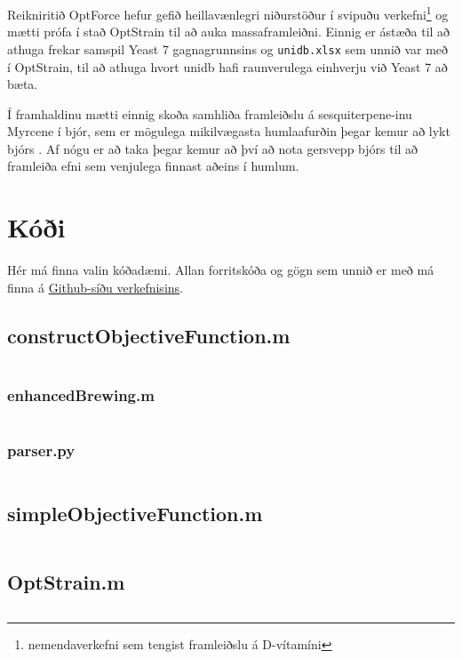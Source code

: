 \documentclass[11pt]{article}
\newcommand{\matlab}[1]{\inputminted[linenos, frame=lines, label=#1, fontsize=\small]{matlab}{#1}}
\begin{document}
\begin{multicols}{2}
Reikniritið OptForce \cite{ranganathan2010optforce} hefur gefið heillavænlegri niðurstöður í svipuðu verkefni\footnote{nemendaverkefni sem tengist framleiðslu á D-vítamíni} og mætti prófa í stað OptStrain til að auka massaframleiðni. Einnig er ástæða til að athuga frekar samspil Yeast 7 gagnagrunnsins og \texttt{unidb.xlsx} sem unnið var með í OptStrain, til að athuga hvort unidb hafi raunverulega einhverju við Yeast 7 að bæta.

Í framhaldinu mætti einnig skoða samhliða framleiðslu á sesquiterpene-inu Myrcene \cite[KEGG: C06074]{Kanehisa01012000} í bjór, sem er mögulega mikilvægasta humlaafurðin þegar kemur að lykt bjórs \cite{guadagni1966odour}. Af nógu er að taka þegar kemur að því að nota gersvepp bjórs til að framleiða efni sem venjulega finnast aðeins í humlum.




\end{multicols}


\clearpage
\appendix
\section{Kóði}
Hér má finna valin kóðadæmi. Allan forritskóða og gögn sem unnið er með má finna á \href{https://github.com/Ernir/optstrain}{Github-síðu verkefnisins}.

\subsection{constructObjectiveFunction.m}
\label{code:constructObjectiveFunction}
\matlab{../constructObjectiveFunction.m}

\subsubsection{enhancedBrewing.m}
\label{code:enhancedBrewing}
\matlab{../enhancedBrewing.m}

\subsubsection{parser.py}
\label{code:parser}
\inputminted[linenos, frame=lines, label=../parser.py, fontsize=\small]{python}{../data/parser.py}

\subsection{simpleObjectiveFunction.m}
\label{code:simpleObjectiveFunction}
\matlab{../simpleObjectiveFunction.m}

\subsection{OptStrain.m}
\label{code:OptStrain}
\matlab{../OptStrain.m}
\end{document}
